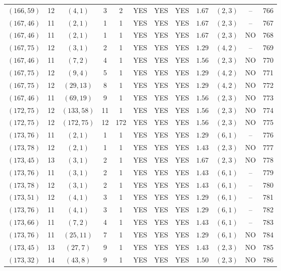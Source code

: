\begin{longtable}{|c|c|c|c|c|c|c|c|c|c|c|c|}
$(166,59)$ & 12 & $(4,1)$ & 3 & 2 & YES & YES & YES & $1.67$ & $(2,3)$ & -- & 766\\
$(167,46)$ & 11 & $(2,1)$ & 1 & 1 & YES & YES & YES & $1.67$ & $(2,3)$ & -- & 767\\
$(167,46)$ & 11 & $(2,1)$ & 1 & 1 & YES & YES & YES & $1.67$ & $(2,3)$ & NO & 768\\
$(167,75)$ & 12 & $(3,1)$ & 2 & 1 & YES & YES & YES & $1.29$ & $(4,2)$ & -- & 769\\
$(167,46)$ & 11 & $(7,2)$ & 4 & 1 & YES & YES & YES & $1.56$ & $(2,3)$ & NO & 770\\
$(167,75)$ & 12 & $(9,4)$ & 5 & 1 & YES & YES & YES & $1.29$ & $(4,2)$ & NO & 771\\
$(167,75)$ & 12 & $(29,13)$ & 8 & 1 & YES & YES & YES & $1.29$ & $(4,2)$ & NO & 772\\
$(167,46)$ & 11 & $(69,19)$ & 9 & 1 & YES & YES & YES & $1.56$ & $(2,3)$ & NO & 773\\
$(172,75)$ & 12 & $(133,58)$ & 11 & 1 & YES & YES & YES & $1.56$ & $(2,3)$ & NO & 774\\
$(172,75)$ & 12 & $(172,75)$ & 12 & 172 & YES & YES & YES & $1.56$ & $(2,3)$ & NO & 775\\
$(173,76)$ & 11 & $(2,1)$ & 1 & 1 & YES & YES & YES & $1.29$ & $(6,1)$ & -- & 776\\
$(173,78)$ & 12 & $(2,1)$ & 1 & 1 & YES & YES & YES & $1.43$ & $(2,3)$ & NO & 777\\
$(173,45)$ & 13 & $(3,1)$ & 2 & 1 & YES & YES & YES & $1.67$ & $(2,3)$ & NO & 778\\
$(173,76)$ & 11 & $(3,1)$ & 2 & 1 & YES & YES & YES & $1.43$ & $(6,1)$ & -- & 779\\
$(173,78)$ & 12 & $(3,1)$ & 2 & 1 & YES & YES & YES & $1.43$ & $(6,1)$ & -- & 780\\
$(173,51)$ & 12 & $(4,1)$ & 3 & 1 & YES & YES & YES & $1.29$ & $(6,1)$ & -- & 781\\
$(173,76)$ & 11 & $(4,1)$ & 3 & 1 & YES & YES & YES & $1.29$ & $(6,1)$ & -- & 782\\
$(173,66)$ & 11 & $(7,2)$ & 4 & 1 & YES & YES & YES & $1.43$ & $(6,1)$ & -- & 783\\
$(173,76)$ & 11 & $(25,11)$ & 7 & 1 & YES & YES & YES & $1.29$ & $(6,1)$ & NO & 784\\
$(173,45)$ & 13 & $(27,7)$ & 9 & 1 & YES & YES & YES & $1.43$ & $(2,3)$ & NO & 785\\
$(173,32)$ & 14 & $(43,8)$ & 9 & 1 & YES & YES & YES & $1.50$ & $(2,3)$ & NO & 786\\

\end{longtable}
